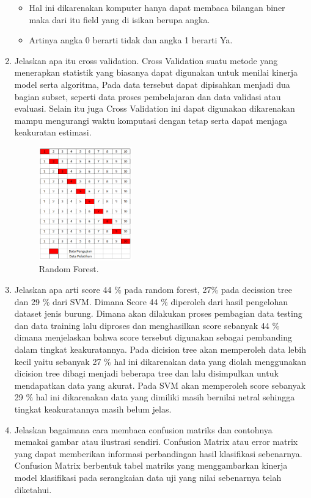 \begin{enumerate}
\begin{itemize}
		\item Hal ini dikarenakan komputer hanya dapat membaca bilangan biner maka dari itu field yang di isikan berupa angka.

		\item Artinya angka 0 berarti tidak dan angka 1 berarti Ya.
	\end{itemize}
	
	\item Jelaskan apa itu cross validation.
	\hfill\break
	Cross Validation suatu metode yang menerapkan statistik yang biasanya  dapat digunakan untuk menilai kinerja model serta algoritma, Pada data tersebut dapat dipisahkan menjadi dua bagian subset, seperti data proses pembelajaran dan data validasi atau evaluasi. Selain itu juga Cross Validation ini dapat digunakan dikarenakan mampu mengurangi waktu komputasi dengan tetap serta dapat menjaga keakuratan estimasi.
	\begin{figure}[H]
	\centering
		\includegraphics[width=4cm]{figures/1174017/3/teori/CrossValidation.PNG}
		\caption{Random Forest.}
	\end{figure}

	\item Jelaskan apa arti score 44 \% pada random forest, 27\% pada decission tree dan 29 \% dari SVM.
	\hfill\break
	Dimana Score 44 \% diperoleh dari hasil pengelohan dataset jenis burung. Dimana akan dilakukan proses pembagian data testing dan data training lalu diproses dan menghasilkan score sebanyak 44 \% dimana menjelaskan bahwa score tersebut digunakan sebagai pembanding dalam tingkat keakuratannya. Pada dicision tree akan memperoleh data lebih kecil yaitu sebanyak 27 \% hal ini dikarenakan data yang diolah menggunakan dicision tree dibagi menjadi beberapa tree dan lalu disimpulkan untuk mendapatkan data yang akurat. Pada SVM akan memperoleh score sebanyak 29 \% hal ini dikarenakan data yang dimiliki masih bernilai netral sehingga tingkat keakuratannya masih belum jelas.

	\item Jelaskan bagaimana cara membaca confusion matriks dan contohnya memakai gambar atau ilustrasi sendiri.
	\hfill\break
	Confusion Matrix atau error matrix yang dapat memberikan informasi perbandingan hasil klasifikasi sebenarnya. Confusion Matrix berbentuk tabel matriks yang menggambarkan kinerja model klasifikasi pada serangkaian data uji yang nilai sebenarnya telah diketahui.


\end{enumerate}
